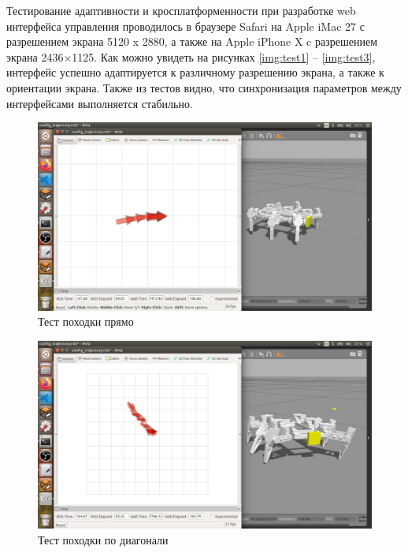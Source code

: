 Тестирование адаптивности и кросплатформенности при разработке web интерфейса управления проводилось в браузере Safari на Apple iMac 27 с разрешением экрана 5120 x 2880, а также на Apple iPhone X c разрешением экрана 2436×1125. Как можно увидеть на рисунках \ref{img:test1} – \ref{img:test3}, интерфейс успешно адаптируется к различному разрешению экрана, а также к ориентации экрана. Также из тестов видно, что синхронизация параметров между интерфейсами выполняется стабильно.

\begin{figure}[h!]
	\centering
	\includegraphics[width = \linewidth]{img/test4}
	\caption{Тест походки прямо}
	\label{img:test4}
\end{figure}

\begin{figure}[h!]
	\centering
	\includegraphics[width = \linewidth]{img/test5}
	\caption{Тест походки по диагонали}
	\label{img:test5}
\end{figure}

